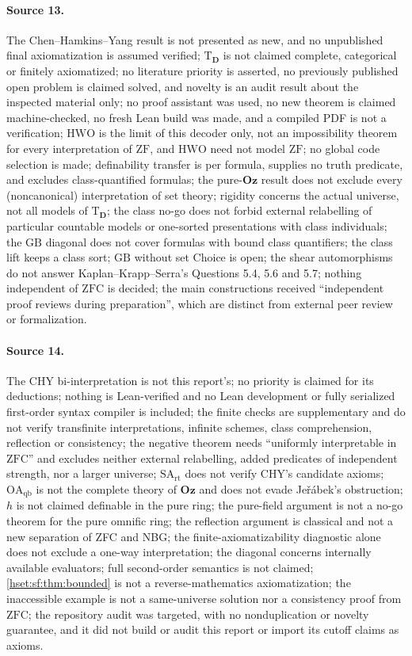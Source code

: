\documentclass[11pt,letterpaper]{article}
\theoremstyle{definition}
\theoremstyle{remark}
\newcommand{\HWO}{\mathrm{HWO}}
\newcommand{\ZFC}{\mathrm{ZFC}}
\newcommand{\ZF}{\mathrm{ZF}}
\newcommand{\Oz}{\mathbf{Oz}}
\newcommand{\GB}{\mathrm{GB}}
\newcommand{\Dd}{\mathbf{D}}
\newcommand{\Tth}{\mathrm{T}}
\newcommand{\SArt}{\mathrm{SA}_{\mathrm{rt}}}
\newcommand{\OAqb}{\mathrm{OA}_{\mathrm{qb}}}
\begin{document}
\paragraph{Source 13.} The Chen--Hamkins--Yang result is not presented as new, and no
unpublished final axiomatization is assumed verified; $\Tth_{\Dd}$ is not claimed
complete, categorical or finitely axiomatized; no literature priority is asserted,
no previously published open problem is claimed solved, and novelty is an audit
result about the inspected material only; no proof assistant was used, no new theorem
is claimed machine-checked, no fresh Lean build was made, and a compiled PDF is not a
verification; $\HWO$ is the limit of this decoder only, not an impossibility theorem
for every interpretation of $\ZF$, and $\HWO$ need not model $\ZF$; no global code
selection is made; definability transfer is per formula, supplies no truth
predicate, and excludes class-quantified formulas; the pure-$\Oz$ result does not
exclude every (noncanonical) interpretation of set theory; rigidity concerns the
actual universe, not all models of $\Tth_{\Dd}$; the class no-go does not forbid
external relabelling of particular countable models or one-sorted presentations
with class individuals; the $\GB$ diagonal does not cover formulas with bound class
quantifiers; the class lift keeps a class sort; $\GB$ without set Choice is open;
the shear automorphisms do not answer Kaplan--Krapp--Serra's Questions 5.4, 5.6 and
5.7; nothing independent of $\ZFC$ is decided; the main constructions received
``independent proof reviews during preparation'', which are distinct from external
peer review or formalization.

\paragraph{Source 14.} The CHY bi-interpretation is not this report's; no priority
is claimed for its deductions; nothing is Lean-verified and no Lean development or
fully serialized first-order syntax compiler is included; the finite checks are
supplementary and do not verify transfinite interpretations, infinite schemes, class
comprehension, reflection or consistency; the negative theorem needs ``uniformly
interpretable in $\ZFC$'' and excludes neither external relabelling, added predicates
of independent strength, nor a larger universe; $\SArt$ does not verify CHY's
candidate axioms; $\OAqb$ is not the complete theory of $\Oz$ and does not evade
Je\v{r}\'abek's obstruction; $h$ is not claimed definable in the pure ring; the
pure-field argument is not a no-go theorem for the pure omnific ring; the reflection
argument is classical and not a new separation of ZFC and NBG; the
finite-axiomatizability diagnostic alone does not exclude a one-way interpretation;
the diagonal concerns internally available evaluators; full second-order semantics
is not claimed; \cref{hset:sf:thm:bounded} is not a reverse-mathematics
axiomatization; the inaccessible example is not a same-universe solution nor a
consistency proof from $\ZFC$; the repository audit was targeted, with no
nonduplication or novelty guarantee, and it did not build or audit this report or
import its cutoff claims as axioms.
\end{document}
